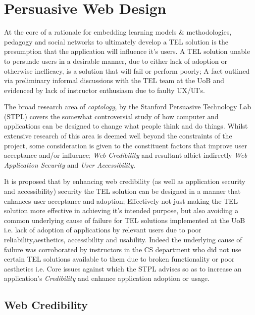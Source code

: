  
\section{Persuasive Web Design}
\label{persuasiveWebDesignStart}

At the core of a rationale for embedding  learning models \& methodologies, pedagogy and social networks to ultimately develop a TEL solution is the presumption that the application will influence it's users. A TEL solution unable to persuade users in a desirable manner, due to either lack of adoption or otherwise inefficacy, is a solution that will fail or perform poorly; A fact outlined via preliminary informal discussions with the TEL team at the UoB and evidenced by lack of instructor enthusiasm due to faulty UX/UI's.

The broad research area of \textit{captology}, by the Stanford Persuasive Technology Lab (STPL) covers the somewhat controversial study of  how computer and applications can be designed to change what people think and do things\cite{Fogg2002a,Fogg2002,Fogg2001,Fogg1999}. Whilst extensive research of this area is deemed well beyond the constraints of the project, some consideration is given to the constituent factors that improve user acceptance and/or influence; \textit{Web Credibility} and resultant albiet indirectly \textit{Web Application Security} and \textit{User Accessibility}.

It is proposed that by enhancing web credibility (as well as  application security and accessibility) security the TEL solution can be designed in a manner that enhances user acceptance and adoption; Effectively not just making the TEL solution more effective in achieving it's intended purpose, but also avoiding a common  underlying cause of failure for TEL solutions implemented at the UoB i.e. lack of adoption of applications by relevant users due to poor reliability,aesthetics, accessibility and usability. Indeed the underlying cause of failure was corroborated by instructors in the CS department who did not use certain TEL solutions available to them due to broken functionality or poor aesthetics i.e. Core issues against which the STPL advises so as to increase an application's \textit{Credibility} \cite{Fogg2002a,Fogg2002,Fogg2001,Fogg1999} and enhance application adoption or usage.








\subsection{Web Credibility}
\label{sec:webCred}

